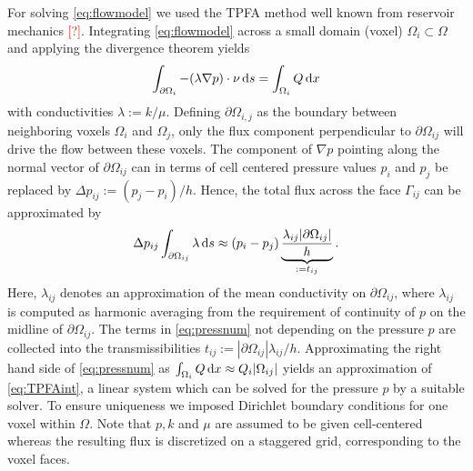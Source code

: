 \documentclass[paper=a4, fontsize=11pt,parskip=half,headings=small]{scrartcl}
\newcommand{\missingsource}{\textcolor{red}{[?]}}
\begin{document}
	For solving \eqref{eq:flowmodel} we used the TPFA method  well known from reservoir mechanics \missingsource.
	Integrating \eqref{eq:flowmodel} across a small domain (voxel) $\Omega_i \subset \Omega$ and applying the divergence theorem yields
	\begin{equation}
		\int_{\partial \Omega_i}   -(\lambda \nabla p) \cdot \nu \,\mathrm{d} s = \int_{\Omega_i}Q \,\mathrm{d} x
	\label{eq:TPFAint}
	\end{equation}
	with conductivities $\lambda := k/\mu$.
	Defining $\partial \Omega_{i,j}$ as the boundary between neighboring voxels $\Omega_i$ and $\Omega_j$, only the flux component perpendicular to $\partial \Omega_{ij}$ will drive the flow between these voxels.
	The component of $\nabla p$ pointing along the normal vector of $\partial \Omega_{ij}$ can in terms of cell centered pressure values $p_i$ and $p_j$ be replaced by
 	$\Delta p_{ij} := (p_j - p_i)/h$.
	Hence, the total flux across the face $\Gamma_{ij}$ can be approximated by
	\begin{equation}
		\Delta p_{ij} \int_{\partial \Omega_{ij}}\lambda \,\mathrm{d} s \approx (p_i - p_j) \underbrace{\frac{\lambda_{ij} \vert \partial \Omega_{ij} \vert}{h}}_{:=t_{ij}}.
		\label{eq:pressnum}
	\end{equation}
	Here, $\lambda_{ij}$ denotes an approximation of the mean conductivity on $\partial \Omega_{ij}$, where $\lambda_{ij}$ is computed as harmonic averaging from the requirement of continuity of $p$ on the midline of $\partial \Omega_{ij}$.
	The terms in \eqref{eq:pressnum} not depending on the pressure $p$ are collected into the transmissibilities $t_{ij}:=|\partial \Omega_{ij}|\lambda_{ij}/h$.
	Approximating the right hand side of \eqref{eq:pressnum} as $\int_{\Omega_i}Q \,\mathrm{d} x \approx Q_i |\Omega_{ij}|$ yields an approximation of \eqref{eq:TPFAint}, a linear system which can be solved for the pressure $p$ by a suitable solver. To ensure uniqueness we imposed Dirichlet boundary conditions for one voxel within $\Omega$.
	Note that $p,k$ and $\mu$ are assumed to be given cell-centered whereas the resulting flux is discretized on a staggered grid, corresponding to the voxel faces.


\end{document}
